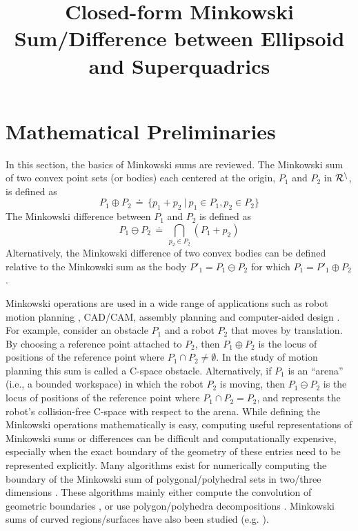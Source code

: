 \documentclass[]{article}
\title{Closed-form Minkowski Sum/Difference between Ellipsoid and Superquadrics}
\begin{document}
\maketitle

\section{Mathematical Preliminaries} \label{mathsec}

In this section, the basics of Minkowski sums are reviewed.
The Minkowski sum of two convex point sets (or bodies) each centered at the origin, $P_1$ and $P_2$ in $\cal R^n$, is defined as
\begin{equation} \label{minksundef}
P_1 \oplus P_2 \,\doteq\, \{p_1+p_2~|~p_1 \in P_1, p_2 \in P_2 \}
\end{equation}
The Minkowski difference between $P_1$ and $P_2$ is defined as \cite{chiu2013stochastic}
\begin{equation}
P_1 \ominus P_2 \,\doteq\, \bigcap_{p_2 \in P_2} (P_1+p_2)
\end{equation}
Alternatively, the Minkowski difference of two convex bodies can be defined relative
to the Minkowski sum as the body $P'_1 = P_1 \ominus P_2$ for which
$P_1 = P'_1 \oplus P_2$.

Minkowski operations are used in a wide range of applications such as robot motion planning \cite{latombe1991robot}, CAD/CAM, assembly planning \cite{halperin2000general} and computer-aided design \cite{hartquist1999computing}. For example, consider an obstacle $P_1$ and a robot $P_2$ that moves by translation. By choosing a reference point attached to $P_2$, then $P_1 \oplus P_2$ is the locus of positions of the reference point where $P_1 \cap P_2 \neq \emptyset$. In the study of motion planning this sum is called a C-space obstacle. Alternatively, if $P_1$ is an ``arena'' (i.e., a bounded workspace) in which the robot $P_2$ is moving, then $P_1 \ominus P_2$ is the locus of positions of the reference point where $P_1 \cap P_2 = P_2$, and represents the robot's collision-free C-space with respect to the arena. While defining the Minkowski operations mathematically is easy, computing useful representations of Minkowski sums or differences can be difficult and computationally expensive, especially when the exact boundary of the geometry of these entries need to be represented explicitly. Many algorithms exist for numerically computing the boundary of the Minkowski sum of polygonal/polyhedral sets in two/three dimensions \cite{guibas1983kinetic,fogel2007exact,hachenberger2009exact,agarwal2002polygon,behar2011dynamic,hartquist1999computing}. These algorithms mainly either compute the convolution of geometric boundaries \cite{guibas1983kinetic}, or use polygon/polyhedra decompositions \cite{agarwal2002polygon,fogel2007exact,hachenberger2009exact,hartquist1999computing}. Minkowski sums of curved regions/surfaces have also been studied (e.g. \cite{bajaj1989generation,sack1999handbook,kaul1995computing,lee1998polynomial}).
\end{document}
